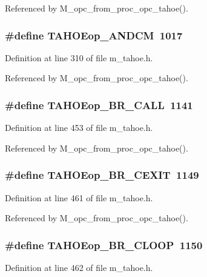 Referenced by M\_\-opc\_\-from\_\-proc\_\-opc\_\-tahoe().
\subsubsection{\setlength{\rightskip}{0pt plus 5cm}\#define TAHOEop\_\-ANDCM~1017}\label{m__tahoe_8h_536aa59c2fe90389512bdbc2df1572fb}




Definition at line 310 of file m\_\-tahoe.h.

Referenced by M\_\-opc\_\-from\_\-proc\_\-opc\_\-tahoe().
\subsubsection{\setlength{\rightskip}{0pt plus 5cm}\#define TAHOEop\_\-BR\_\-CALL~1141}\label{m__tahoe_8h_91b801e7c67e1d351b5175a1c4fd35a3}




Definition at line 453 of file m\_\-tahoe.h.

Referenced by M\_\-opc\_\-from\_\-proc\_\-opc\_\-tahoe().
\subsubsection{\setlength{\rightskip}{0pt plus 5cm}\#define TAHOEop\_\-BR\_\-CEXIT~1149}\label{m__tahoe_8h_a2ff1171193d903ed70e0f260f33a331}




Definition at line 461 of file m\_\-tahoe.h.

Referenced by M\_\-opc\_\-from\_\-proc\_\-opc\_\-tahoe().
\subsubsection{\setlength{\rightskip}{0pt plus 5cm}\#define TAHOEop\_\-BR\_\-CLOOP~1150}\label{m__tahoe_8h_89b902b9683aa0ebacdeec76b77bb98e}




Definition at line 462 of file m\_\-tahoe.h.

